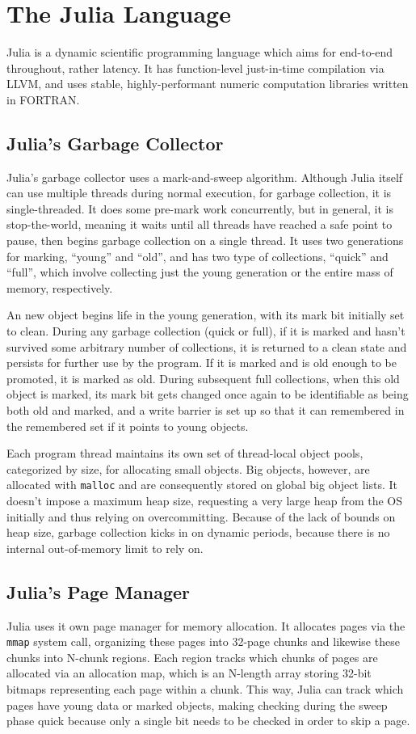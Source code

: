 \section{The Julia Language} \label{julia}
Julia is a dynamic scientific programming language which aims for end-to-end throughout, rather latency.
It has function-level just-in-time compilation via LLVM, and uses stable, highly-performant numeric computation libraries written in FORTRAN.

\subsection{Julia's Garbage Collector}
Julia's garbage collector uses a mark-and-sweep algorithm.
Although Julia itself can use multiple threads during normal execution, for garbage collection, it is single-threaded.
It does some pre-mark work concurrently, but in general, it is stop-the-world, meaning it waits until all threads have reached a safe point to pause, then begins garbage collection on a single thread.
It uses two generations for marking, ``young'' and ``old'', and has two type of collections, ``quick'' and ``full'', which involve collecting just the young generation or the entire mass of memory, respectively.

An new object begins life in the young generation, with its mark bit initially set to clean.
During any garbage collection (quick or full), if it is marked and hasn't survived some arbitrary number of collections, it is returned to a clean state and persists for further use by the program.
If it is marked and is old enough to be promoted, it is marked as old.
During subsequent full collections, when this old object is marked, its mark bit gets changed once again to be identifiable as being both old and marked, and a write barrier is set up so that it can remembered in the remembered set if it points to young objects.

Each program thread maintains its own set of thread-local object pools, categorized by size, for allocating small objects.
Big objects, however, are allocated with \texttt{malloc} and are consequently stored on global big object lists.
It doesn't impose a maximum heap size, requesting a very large heap from the OS initially and thus relying on overcommitting.
Because of the lack of bounds on heap size, garbage collection kicks in on dynamic periods, because there is no internal out-of-memory limit to rely on.

\subsection{Julia's Page Manager}
Julia uses it own page manager for memory allocation.
It allocates pages via the \texttt{mmap} system call, organizing these pages into 32-page chunks and likewise these chunks into N-chunk regions.
Each region tracks which chunks of pages are allocated via an allocation map, which is an N-length array storing 32-bit bitmaps representing each page within a chunk.
This way, Julia can track which pages have young data or marked objects, making checking during the sweep phase quick because only a single bit needs to be checked in order to skip a page.

